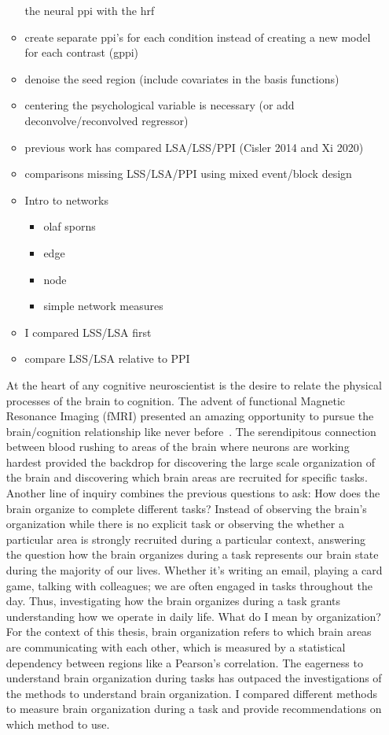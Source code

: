 \documentclass[phd,appendix,figures]{uithesis}
\begin{document}
\begin{itemize}
\begin{itemize}
			the neural ppi with the hrf
		\item create separate ppi's for each condition instead of creating a
		      new model for each contrast (gppi)
		\item denoise the seed region (include covariates in the basis functions)
		\item centering the psychological variable is necessary (or add deconvolve/reconvolved regressor)
	\item previous work has compared LSA/LSS/PPI (Cisler 2014 and Xi 2020)
	\item comparisons missing LSS/LSA/PPI using mixed event/block design
	\item Intro to networks
	\begin{itemize}
		\item olaf sporns
		\item edge
		\item node
		\item simple network measures
	\end{itemize}
	\item I compared LSS/LSA first
	\item compare LSS/LSA relative to PPI
\end{itemize}
At the heart of any cognitive neuroscientist is the desire to relate the physical
processes of the brain to cognition.
The advent of functional Magnetic Resonance Imaging (fMRI) presented an amazing opportunity
to pursue the brain/cognition relationship like never before~\cite{ogawa1990}.
The serendipitous connection between blood rushing to areas of the brain where neurons
are working hardest provided the backdrop for discovering the large scale organization
of the brain and discovering which brain areas are recruited for specific tasks.
Another line of inquiry combines the previous questions to ask: How does the brain
organize to complete different tasks?
Instead of observing the brain's organization while there is no explicit task or observing
the whether a particular area is strongly recruited during a particular context,
answering the question how the brain organizes during a task represents our brain state
during the majority of our lives.
Whether it's writing an email, playing a card game, talking with colleagues; we are
often engaged in tasks throughout the day.
Thus, investigating how the brain organizes during a task grants understanding how
we operate in daily life.
What do I mean by organization?
For the context of this thesis, brain organization refers to which brain areas are communicating
with each other, which is measured by a statistical dependency between
regions like a Pearson's correlation.
The eagerness to understand brain organization during tasks has outpaced the investigations
of the methods to understand brain organization.
I compared different methods to measure brain organization during a task
and provide recommendations on which method to use.


\end{itemize}
\end{document}
